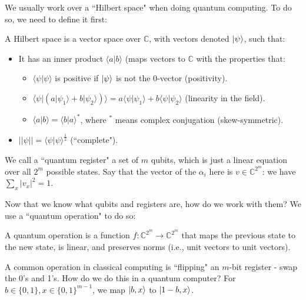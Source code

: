 \par We usually work over a ``Hilbert space" when doing quantum computing. To do so, we need to define it first:
\begin{definition}
A Hilbert space is a vector space over $\mathbb{C}$, with vectors denoted $\vert \psi \rangle$, such that:
\begin{itemize}
\item It has an inner product $\langle a \vert b \rangle$ (maps vectors to $\mathbb{C}$ with the properties that:
\begin{itemize}
\item $\langle \psi \vert \psi \rangle$ is positive if $\vert \psi \rangle$ is not the 0-vector (positivity).
\item $\langle \psi \vert (a \vert \psi_1 \rangle + b \vert \psi_2 \rangle) \rangle = a\langle \psi \vert \psi_1 \rangle + b \langle \psi \vert \psi_2 \rangle$ (linearity in the field).
\item $\langle a \vert b \rangle = \langle b \vert a \rangle^*$, where $^*$ means complex conjugation (skew-symmetric).
\end{itemize}
\item $||\psi|| = \langle \psi \vert \psi \rangle^{\frac{1}{2}}$ (``complete").
\end{itemize}
\end{definition}

We call a ``quantum register" a set of $m$ qubits, which is just a linear equation over all $2^m$ possible states. Say that the vector of the $\alpha_i$ here is $v \in \mathbb{C}^{2^m}$: we have $\sum_{x}|v_x|^2 = 1$. 

\par Now that we know what qubits and registers are, how do we work with them? We use a ``quantum operation" to do so:
\begin{definition}
A quantum operation is a function $f \colon \mathbb{C}^{2^m} \rightarrow \mathbb{C}^{2^m}$ that maps the previous state to the new state, is linear, and preserves norms (i.e., unit vectors to unit vectors).
\end{definition}

\begin{example}
A common operation in classical computing is ``flipping" an $m$-bit register - swap the 0's and 1's. How do we do this in a quantum computer? For $b \in \{0, 1\}, x \in \{0, 1\}^{m-1}$, we map $\vert b, x \rangle$ to $\vert 1-b, x \rangle$. 
\end{example}
